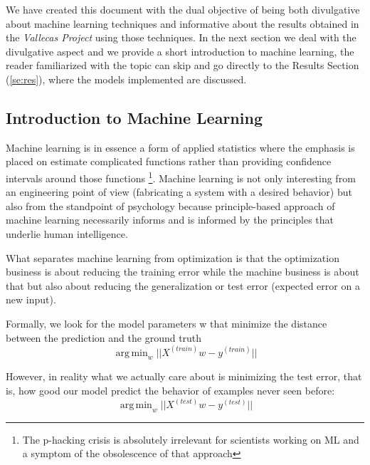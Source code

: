 \documentclass[11pt]{article}
\theoremstyle{definition}
\theoremstyle{remark}
\DeclareMathOperator*{\argmin}{arg\,min}
\begin{document}
{We have created this document with the dual objective of being both divulgative about machine learning techniques and informative about the results obtained in the \emph{Vallecas Project} using those techniques.
In the next section we deal with the divulgative aspect and we provide a short introduction to machine learning, the reader familiarized with the topic can skip and go directly to the Results Section (\ref{se:res}), where the models implemented are discussed.


\subsection{Introduction to Machine Learning} 
\label{sse:iml}
Machine learning is in essence a form of applied statistics where the emphasis is placed on estimate complicated functions rather than providing confidence intervals around those functions \footnote{The p-hacking crisis is absolutely irrelevant for scientists working on ML and a symptom of the obsolescence of that approach}. Machine learning is not only interesting from an engineering point of view (fabricating a system with a desired behavior) but also from the standpoint of psychology because principle-based approach of machine learning necessarily informs and is informed by the principles that underlie human intelligence.

What separates machine learning from optimization is that the optimization business is about reducing the training error while the machine business is about that but also about reducing the generalization or test error (expected error on a new input). 

Formally, we look for the model parameters w that minimize the distance between the prediction and the ground truth
\begin{equation}
\argmin_{w} ||X^{(train)}w - y^{(train)}||
\label{eq:reaintest1}
\end{equation}

However, in reality what we actually care about is minimizing the test error, that is, how good our model predict the behavior of examples never seen before:
\begin{equation}
\argmin_{w} ||X^{(test)}w - y^{(test)}||
\end{equation}

}
\end{document}
